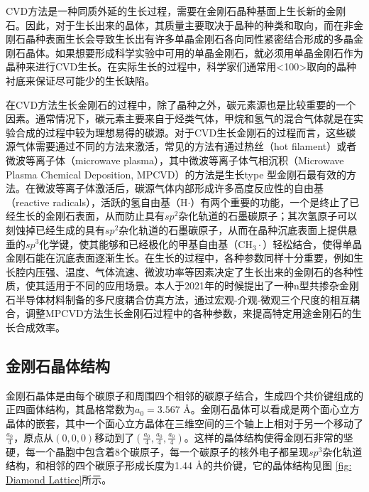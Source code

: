\documentclass[type = bachelor, oneside]{whu-thesis}
\begin{document}
CVD方法是一种同质外延的生长过程，需要在金刚石晶种基面上生长新的金刚石\cite{Isberg2002}。因此，对于生长出来的晶体，其质量主要取决于晶种的种类和取向，而在非金刚石晶种表面生长会导致生长出有许多单晶金刚石各向同性紧密结合形成的多晶金刚石晶体\cite{2013, Jahnke2012}。如果想要形成科学实验中可用的单晶金刚石，就必须用单晶金刚石作为晶种来进行CVD生长。在实际生长的过程中，科学家们通常用<100>取向的晶种衬底来保证尽可能少的生长缺陷\cite{Gicquel2001}。

在CVD方法生长金刚石的过程中，除了晶种之外，碳元素源也是比较重要的一个因素。通常情况下，碳元素主要来自于烃类气体，甲烷和氢气的混合气体就是在实验合成的过程中较为理想易得的碳源。对于CVD生长金刚石的过程而言，这些碳源气体需要通过不同的方法来激活，常见的方法有通过热丝（hot filament）或者微波等离子体（microwave plasma），其中微波等离子体气相沉积（Microwave Plasma Chemical Deposition, MPCVD）的方法是生长type \uppercase\expandafter{}型金刚石最有效的方法\cite{Robins1990, Nemanich2014}。在微波等离子体激活后，碳源气体内部形成许多高度反应性的自由基（reactive radicals），活跃的氢自由基（H$\cdot$）有两个重要的功能，一个是终止了已经生长的金刚石表面，从而防止具有$sp^2$杂化轨道的石墨碳原子；其次氢原子可以刻蚀掉已经生成的具有$sp^2$杂化轨道的石墨碳原子，从而在晶种沉底表面上提供悬垂的$sp^3$化学键，使其能够和已经极化的甲基自由基（CH$_3\cdot$）轻松结合，使得单晶金刚石能在沉底表面逐渐生长\cite{Denisenko2010}。在生长的过程中，各种参数同样十分重要，例如生长腔内压强、温度、气体流速、微波功率等因素决定了生长出来的金刚石的各种性质，使其适用于不同的应用场景。本人于2021年的时候提出了一种n型共掺杂金刚石半导体材料制备的多尺度耦合仿真方法，通过宏观-介观-微观三个尺度的相互耦合，调整MPCVD方法生长金刚石过程中的各种参数，来提高特定用途金刚石的生长合成效率\cite{CN113096749B}。

\subsection{金刚石晶体结构}
金刚石晶体是由每个碳原子和周围四个相邻的碳原子结合，生成四个共价键组成的正四面体结构，其晶格常数为$a_0 = 3.567$ \unit{\angstrom}。金刚石晶体可以看成是两个面心立方晶体的嵌套，其中一个面心立方晶体在三维空间的三个轴上上相对于另一个移动了$\frac{a_0}{4}$，原点从$(0, 0, 0)$移动到了$(\frac{a_0}{4}, \frac{a_0}{4}, \frac{a_0}{4})$。这样的晶体结构使得金刚石非常的坚硬，每一个晶胞中包含着8个碳原子，每一个碳原子的核外电子都呈现$sp^3$杂化轨道结构，和相邻的四个碳原子形成长度为1.44 \unit{\angstrom}的共价键，它的晶体结构见图 \ref{fig: Diamond Lattice}所示。
\end{document}
